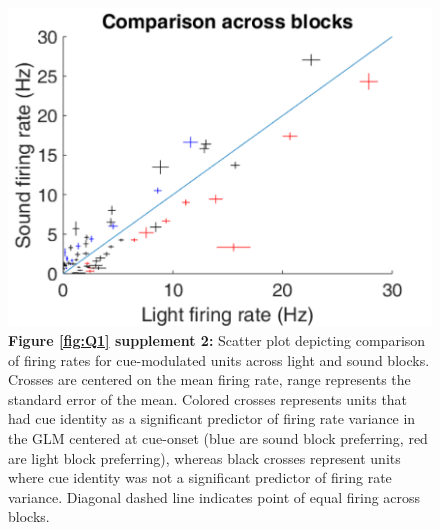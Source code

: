 \documentclass[11pt]{article}
\newcommand{\bsf}[1]{\textbf{#1}}
\begin{document}
 \begin{figure}[ht!]
\centering
\includegraphics[height=0.3\textheight]{Fig 4 - SUPP scatter.pdf}
\caption*{\bsf{Figure \ref{fig:Q1} supplement 2:} Scatter plot depicting comparison
  of firing rates for cue-modulated units across light and sound
  blocks. Crosses are centered on the mean firing rate, range
  represents the standard error of the mean. Colored crosses represents units that had cue
  identity as a significant predictor of firing rate variance in the GLM centered at cue-onset (blue
  are sound block preferring, red are light block preferring), whereas
  black crosses represent units where cue identity was not a
  significant predictor of firing rate variance. Diagonal dashed line
  indicates point of equal firing across blocks.}
\label{fig:Q1SUPP2}
\end{figure} \clearpage
\end{document}
